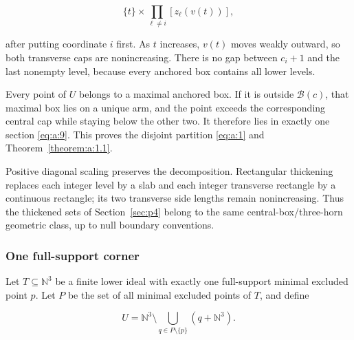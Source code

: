 \begin{equation}
\{t\}\times\prod_{\ell\ne i}[z_\ell(v(t))],
\label{eq:a:9}
\end{equation}

after putting coordinate \(i\) first. As \(t\) increases, \(v(t)\) moves
weakly outward, so both transverse caps are nonincreasing. There is no gap
between \(c_i+1\) and the last nonempty level, because every anchored box
contains all lower levels.

Every point of \(U\) belongs to a maximal anchored box. If it is outside
\(\mathcal B(c)\), that maximal box lies on a unique arm, and the point
exceeds the corresponding central cap while staying below the other two.
It therefore lies in exactly one section \eqref{eq:a:9}. This proves the disjoint
partition \eqref{eq:a:1} and Theorem~\ref{theorem:a:1.1}.
\hfill\qedsymbol

Positive diagonal scaling preserves the decomposition. Rectangular
thickening replaces each integer level by a slab and each integer transverse
rectangle by a continuous rectangle; its two transverse side lengths remain
nonincreasing. Thus the thickened sets of Section~\ref{sec:p4} belong to the same
central-box/three-horn geometric class, up to null boundary conventions.

\subsubsection{One full-support corner}

Let \(T\subseteq\mathbb N^3\) be a finite lower ideal with exactly one
full-support minimal excluded point \(p\). Let \(P\) be the set of all
minimal excluded points of \(T\), and define

\begin{equation}
U=\mathbb N^3\setminus
\bigcup_{q\in P\setminus\{p\}}(q+\mathbb N^3).
\label{eq:a:10}
\end{equation}


